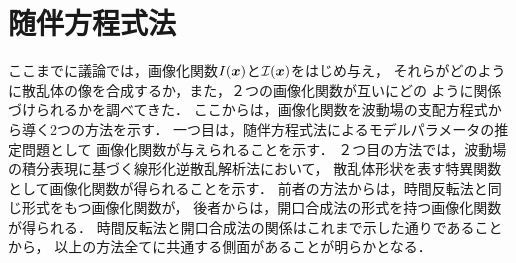 \section{随伴方程式法}
ここまでに議論では，画像化関数$I(\mbox{\boldmath $x$})$と${\cal I}(\mbox{\boldmath $x$})$をはじめ与え，
それらがどのように散乱体の像を合成するか，また，２つの画像化関数が互いにどの
ように関係づけられるかを調べてきた．
ここからは，画像化関数を波動場の支配方程式から導く2つの方法を示す．
一つ目は，随伴方程式法によるモデルパラメータの推定問題として
画像化関数が与えられることを示す．
２つ目の方法では，波動場の積分表現に基づく線形化逆散乱解析法において，
散乱体形状を表す特異関数として画像化関数が得られることを示す．
前者の方法からは，時間反転法と同じ形式をもつ画像化関数が，
後者からは，開口合成法の形式を持つ画像化関数が得られる．
時間反転法と開口合成法の関係はこれまで示した通りであることから，
以上の方法全てに共通する側面があることが明らかとなる．
